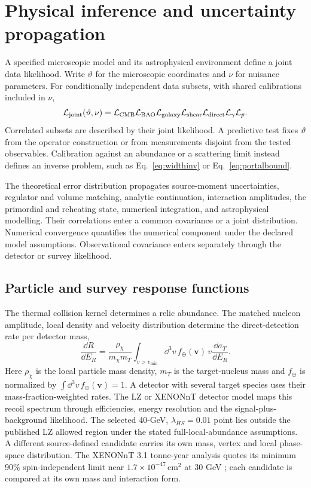\section{Physical inference and uncertainty propagation}\label{sec:inference}
A specified microscopic model and its astrophysical environment define a joint data likelihood. Write $\vartheta$ for the microscopic coordinates and $\nu$ for nuisance parameters. For conditionally independent data subsets, with shared calibrations included in $\nu$,
\begin{equation}
\mathcal L_{\rm joint}(\vartheta,\nu)=\mathcal L_{\mathrm{CMB}}\mathcal L_{\rm BAO}
\mathcal L_{\rm galaxy}\mathcal L_{\rm shear}\mathcal L_{\rm direct}\mathcal L_{\gamma}\mathcal L_{\bar p}.
\end{equation}
Correlated subsets are described by their joint likelihood. A predictive test fixes $\vartheta$ from the operator construction or from measurements disjoint from the tested observables. Calibration against an abundance or a scattering limit instead defines an inverse problem, such as Eq.~\eqref{eq:widthinv} or Eq.~\eqref{eq:portalbound}.

The theoretical error distribution propagates source-moment uncertainties, regulator and volume matching, analytic continuation, interaction amplitudes, the primordial and reheating state, numerical integration, and astrophysical modelling. Their correlations enter a common covariance or a joint distribution. Numerical convergence quantifies the numerical component under the declared model assumptions. Observational covariance enters separately through the detector or survey likelihood.

\subsection{Particle and survey response functions}\label{sec:comparisonhierarchy}
The thermal collision kernel determines a relic abundance. The matched nucleon amplitude, local density and velocity distribution determine the direct-detection rate per detector mass,
\begin{equation}\label{eq:direct-count}
\frac{\dd R}{\dd E_R}=\frac{\rho_\chi}{m_\chi m_T}
\int_{v>v_{\min}}\dd^3v\,f_\oplus(\mathbf v)\,v
\frac{\dd\sigma_T}{\dd E_R}.
\end{equation}
Here $\rho_\chi$ is the local particle mass density, $m_T$ is the target-nucleus mass and $f_\oplus$ is normalized by $\int\dd^3v\,f_\oplus(\mathbf v)=1$. A detector with several target species uses their mass-fraction-weighted rates.
The LZ or XENONnT detector model maps this recoil spectrum through efficiencies, energy resolution and the signal-plus-background likelihood. The selected 40-GeV, $\lambda_{HS}=0.01$ point lies outside the published LZ allowed region under the stated full-local-abundance assumptions. A different source-defined candidate carries its own mass, vertex and local phase-space distribution. The XENONnT 3.1 tonne-year analysis quotes its minimum 90\% spin-independent limit near $1.7\times10^{-47}\,\mathrm{cm}^2$ at 30 GeV \cite{XENON25}; each candidate is compared at its own mass and interaction form.

